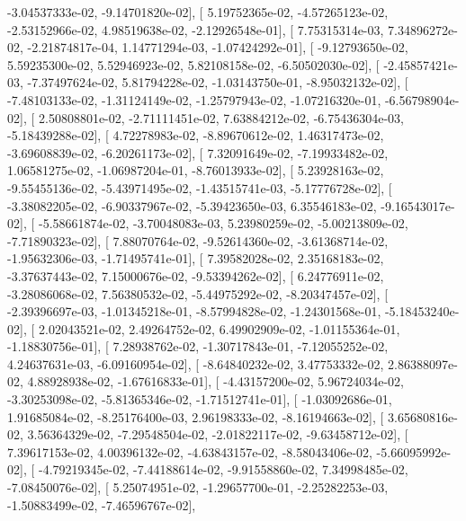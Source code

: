 \documentclass{article}
\begin{document}
         -3.04537333e-02,  -9.14701820e-02],
       [  5.19752365e-02,  -4.57265123e-02,  -2.53152966e-02,
          4.98519638e-02,  -2.12926548e-01],
       [  7.75315314e-03,   7.34896272e-02,  -2.21874817e-04,
          1.14771294e-03,  -1.07424292e-01],
       [ -9.12793650e-02,   5.59235300e-02,   5.52946923e-02,
          5.82108158e-02,  -6.50502030e-02],
       [ -2.45857421e-03,  -7.37497624e-02,   5.81794228e-02,
         -1.03143750e-01,  -8.95032132e-02],
       [ -7.48103133e-02,  -1.31124149e-02,  -1.25797943e-02,
         -1.07216320e-01,  -6.56798904e-02],
       [  2.50808801e-02,  -2.71111451e-02,   7.63884212e-02,
         -6.75436304e-03,  -5.18439288e-02],
       [  4.72278983e-02,  -8.89670612e-02,   1.46317473e-02,
         -3.69608839e-02,  -6.20261173e-02],
       [  7.32091649e-02,  -7.19933482e-02,   1.06581275e-02,
         -1.06987204e-01,  -8.76013933e-02],
       [  5.23928163e-02,  -9.55455136e-02,  -5.43971495e-02,
         -1.43515741e-03,  -5.17776728e-02],
       [ -3.38082205e-02,  -6.90337967e-02,  -5.39423650e-03,
          6.35546183e-02,  -9.16543017e-02],
       [ -5.58661874e-02,  -3.70048083e-03,   5.23980259e-02,
         -5.00213809e-02,  -7.71890323e-02],
       [  7.88070764e-02,  -9.52614360e-02,  -3.61368714e-02,
         -1.95632306e-03,  -1.71495741e-01],
       [  7.39582028e-02,   2.35168183e-02,  -3.37637443e-02,
          7.15000676e-02,  -9.53394262e-02],
       [  6.24776911e-02,  -3.28086068e-02,   7.56380532e-02,
         -5.44975292e-02,  -8.20347457e-02],
       [ -2.39396697e-03,  -1.01345218e-01,  -8.57994828e-02,
         -1.24301568e-01,  -5.18453240e-02],
       [  2.02043521e-02,   2.49264752e-02,   6.49902909e-02,
         -1.01155364e-01,  -1.18830756e-01],
       [  7.28938762e-02,  -1.30717843e-01,  -7.12055252e-02,
          4.24637631e-03,  -6.09160954e-02],
       [ -8.64840232e-02,   3.47753332e-02,   2.86388097e-02,
          4.88928938e-02,  -1.67616833e-01],
       [ -4.43157200e-02,   5.96724034e-02,  -3.30253098e-02,
         -5.81365346e-02,  -1.71512741e-01],
       [ -1.03092686e-01,   1.91685084e-02,  -8.25176400e-03,
          2.96198333e-02,  -8.16194663e-02],
       [  3.65680816e-02,   3.56364329e-02,  -7.29548504e-02,
         -2.01822117e-02,  -9.63458712e-02],
       [  7.39617153e-02,   4.00396132e-02,  -4.63843157e-02,
         -8.58043406e-02,  -5.66095992e-02],
       [ -4.79219345e-02,  -7.44188614e-02,  -9.91558860e-02,
          7.34998485e-02,  -7.08450076e-02],
       [  5.25074951e-02,  -1.29657700e-01,  -2.25282253e-03,
         -1.50883499e-02,  -7.46596767e-02],
\end{document}
